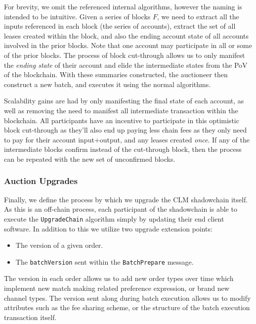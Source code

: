 \documentclass[10pt,a4paper]{article}
\theoremstyle{definition}
\begin{document}
For brevity, we omit the referenced internal algorithms, however the naming is
intended to be intuitive. Given a series of blocks $F$, we need to extract all
the inputs referenced in each block (the series of accounts), extract the set
of all leases created within the block, and also the ending account state of
all accounts involved in the prior blocks. Note that one account may
participate in all or some of the prior blocks. The process of block
cut-through allows us to only manifest the \emph{ending state} of their account
and elide the intermediate states from the PoV of the blockchain. With these
summaries constructed, the auctioneer then construct a new batch, and executes
it using the normal algorithms.

Scalability gains are had by only manifesting the final state of each account,
as well as removing the need to manifest all intermediate transaction within
the blockchain.  All participants have an incentive to participate in this
optimistic block cut-through as they'll also end up paying less chain fees as
they only need to pay for their account input+output, and any leases created
\emph{once}. If any of the intermediate blocks confirm instead of the
cut-through block, then the process can be repeated with the new set of
unconfirmed blocks.

\subsubsection{Auction Upgrades}

Finally, we define the process by which we upgrade the CLM shadowchain itself.
As this is an off-chain process, each participant of the shadowchain is able to
execute the \texttt{UpgradeChain} algorithm simply by updating their end client
software. In addition to this we utilize two upgrade extension points:
\begin{itemize}
    \item The version of a given order.
    \item The \texttt{batchVersion} sent within the \texttt{BatchPrepare}
        message.
\end{itemize}

The version in each order allows us to add new order types over time which
implement new match making related preference expression, or brand new channel
types. The version sent along during batch execution allows us to modify
attributes such as the fee sharing scheme, or the structure of the batch
execution transaction itself.
\end{document}
